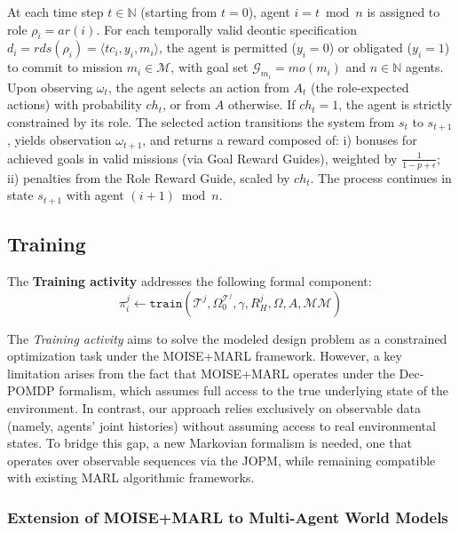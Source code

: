 \noindent At each time step $t \in \mathbb{N}$ (starting from $t=0$), agent $i = t \bmod n$ is assigned to role $\rho_i = ar(i)$. For each temporally valid deontic specification $d_i = rds(\rho_i) = \langle tc_i, y_i, m_i \rangle$, the agent is permitted ($y_i = 0$) or obligated ($y_i = 1$) to commit to mission $m_i \in \mathcal{M}$, with goal set $\mathcal{G}_{m_i} = mo(m_i)$ and $n \in \mathbb{N}$ agents.
%
Upon observing $\omega_t$, the agent selects an action from $A_t$ (the role-expected actions) with probability $ch_t$, or from $A$ otherwise. If $ch_t = 1$, the agent is strictly constrained by its role.
%
The selected action transitions the system from $s_t$ to $s_{t+1}$, yields observation $\omega_{t+1}$, and returns a reward composed of:
i) bonuses for achieved goals in valid missions (via Goal Reward Guides), weighted by $\frac{1}{1 - p + \epsilon}$;
ii) penalties from the Role Reward Guide, scaled by $ch_t$.
%
The process continues in state $s_{t+1}$ with agent $(i + 1) \bmod n$.


\subsection{Training}\label{sec:training}

The \textbf{Training activity} addresses the following formal component:
%
\begin{displaymath}
    \pi^j_i \gets \texttt{train}(\mathcal{T}^j, \Omega^{\mathcal{T}^j}_0, \gamma, R^j_H, \Omega, A, \mathcal{MM})
\end{displaymath}

The \textit{Training activity} aims to solve the modeled design problem as a constrained optimization task under the MOISE+MARL framework. However, a key limitation arises from the fact that MOISE+MARL operates under the Dec-POMDP formalism, which assumes full access to the true underlying state of the environment. In contrast, our approach relies exclusively on observable data (namely, agents' joint histories) without assuming access to real environmental states. To bridge this gap, a new Markovian formalism is needed, one that operates over observable sequences via the JOPM, while remaining compatible with existing MARL algorithmic frameworks.


\subsubsection{Extension of MOISE+MARL to Multi-Agent World Models}

